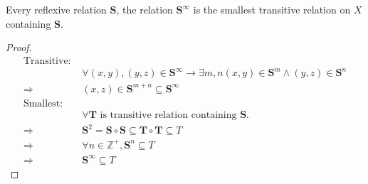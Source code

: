 \begin{Lem}\label{Lem:1.4.8}
    Every reflexive relation $\mathbf{S}$, the relation $\mathbf{S}^{\infty}$ is the smallest transitive relation on $X$ containing $\mathbf{S}$.

    \begin{proof}
        \begin{align*}
            \text{Transitive: } & \\
            &\forall (x,y),(y,z)\in \mathbf{S}^{\infty}\rightarrow  \exists m,n (x,y)\in \mathbf{S}^m \wedge (y,z)\in \mathbf{S}^n  \\
            \Rightarrow& (x,z) \in \mathbf{S}^{m+n} \subseteq \mathbf{S}^{\infty}   \\
            \text{Smallest: } & \\
            &\forall \mathbf{T} \text{ is transitive relation containing }\mathbf{S}.\\
            \Rightarrow& \mathbf{S}^2=\mathbf{S}\circ \mathbf{S}\subseteq \mathbf{T}\circ \mathbf{T}\subseteq T \\
            \Rightarrow& \forall n \in \mathbb{Z}^+, \mathbf{S}^n \subseteq T   \\
            \Rightarrow& \mathbf{S}^{\infty} \subseteq T
        \end{align*}
    \end{proof}
\end{Lem}

